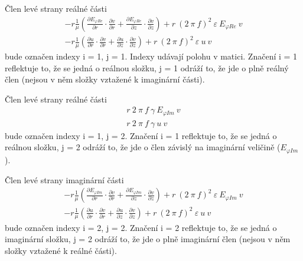 \documentclass[12pt,a4paper,oneside]{article}
\numberwithin{equation}{section} %
\numberwithin{figure}{section} %
\numberwithin{table}{section} %
\begin{document}
Člen levé strany reálné části
\begin{subequations}
\begin{gather}
- r \frac{1}{\mu} \left( \frac{\partial E _{\varphi Re}}{\partial r} \cdot \frac{\partial v}{\partial r} + \frac{\partial E _{\varphi Re}}{\partial z} \cdot \frac{\partial v}{\partial z} \right) + r ~ (2 ~ \pi ~ f) ^2 ~ \varepsilon ~ E _{\varphi Re} ~ v
\\
- r \frac{1}{\mu} \left( \frac{\partial u}{\partial r} \cdot \frac{\partial v}{\partial r} + \frac{\partial u}{\partial z} \cdot \frac{\partial v}{\partial z} \right) + r ~ (2 ~ \pi ~ f) ^2  ~ \varepsilon ~ u ~ v
\end{gather}
\end{subequations}
bude označen indexy i = 1, j = 1. Indexy udávají polohu v matici. Značení i = 1 reflektuje to, že se jedná o reálnou složku, j = 1 odráží to, že jde o plně reálný člen (nejsou v něm složky vztažené k imaginární části). 

Člen levé strany reálné části
\begin{subequations}
\begin{gather}
r ~ 2 ~ \pi ~ f ~ \gamma ~ E _{\varphi Im} ~ v
\\
r ~ 2 ~ \pi ~ f ~ \gamma ~ u ~ v
\end{gather}
\end{subequations}
bude označen indexy i = 1, j = 2. Značení i = 1 reflektuje to, že se jedná o reálnou složku, j = 2 odráží to, že jde o člen závislý na imaginární veličině ($E _{\varphi Im}$).


Člen levé strany imaginární části
\begin{subequations}
\begin{gather}
- r \frac{1}{\mu} \left( \frac{\partial E _{\varphi Im}}{\partial r} \cdot \frac{\partial v}{\partial r} + \frac{\partial E _{\varphi Im}}{\partial z} \cdot \frac{\partial v}{\partial z} \right) + r ~ (2 ~ \pi ~ f) ^2 ~ \varepsilon ~ E _{\varphi Im} ~ v
\\
- r \frac{1}{\mu} \left( \frac{\partial u}{\partial r} \cdot \frac{\partial v}{\partial r} + \frac{\partial u}{\partial z} \cdot \frac{\partial v}{\partial z} \right) + r ~ (2 ~ \pi ~ f) ^2 ~ \varepsilon ~ u ~ v
\end{gather}
\end{subequations}
bude označen indexy i = 2, j = 2. Značení i = 2 reflektuje to, že se jedná o imaginární složku, j = 2 odráží to, že jde o plně imaginární člen (nejsou v něm složky vztažené k reálné části). 
\end{document}
